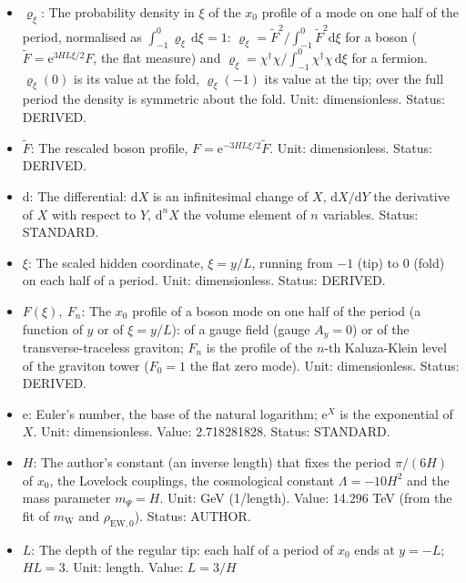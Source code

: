 \documentclass[
  10pt,
]{article}
\providecommand{\tightlist}{%
  \setlength{\itemsep}{0pt}\setlength{\parskip}{0pt}}
\begin{document}
\begin{itemize}
\tightlist
\item
  \(\varrho_\xi\): The probability density in \(\xi\) of the \(x_0\)
  profile of a mode on one half of the period, normalised as
  \(\int_{-1}^{0}\varrho_\xi\,\mathrm{d}\xi = 1\):
  \(\varrho_\xi = \tilde F^2/\int_{-1}^{0}\tilde F^2\mathrm{d}\xi\) for
  a boson (\(\tilde F = \mathrm{e}^{3HL\xi/2}F\), the flat measure) and
  \(\varrho_\xi = \chi^\dagger\chi/\int_{-1}^{0}\chi^\dagger\chi\,\mathrm{d}\xi\)
  for a fermion. \(\varrho_\xi(0)\) is its value at the fold,
  \(\varrho_\xi(-1)\) its value at the tip; over the full period the
  density is symmetric about the fold. Unit: dimensionless. Status:
  DERIVED.
\item
  \(\tilde F\): The rescaled boson profile,
  \(F = \mathrm{e}^{-3HL\xi/2}\tilde F\). Unit: dimensionless. Status:
  DERIVED.
\item
  \(\mathrm{d}\): The differential: \(\mathrm{d}X\) is an infinitesimal
  change of \(X\), \(\mathrm{d}X/\mathrm{d}Y\) the derivative of \(X\)
  with respect to \(Y\), \(\mathrm{d}^nX\) the volume element of \(n\)
  variables. Status: STANDARD.
\item
  \(\xi\): The scaled hidden coordinate, \(\xi = y/L\), running from
  \(-1\) (tip) to \(0\) (fold) on each half of a period. Unit:
  dimensionless. Status: DERIVED.
\item
  \(F(\xi),\ F_n\): The \(x_0\) profile of a boson mode on one half of
  the period (a function of \(y\) or of \(\xi = y/L\)): of a gauge field
  (gauge \(A_y = 0\)) or of the transverse-traceless graviton; \(F_n\)
  is the profile of the \(n\)-th Kaluza-Klein level of the graviton
  tower (\(F_0 = 1\) the flat zero mode). Unit: dimensionless. Status:
  DERIVED.
\item
  \(\mathrm{e}\): Euler's number, the base of the natural logarithm;
  \(\mathrm{e}^{X}\) is the exponential of \(X\). Unit: dimensionless.
  Value: 2.718281828. Status: STANDARD.
\item
  \(H\): The author's constant (an inverse length) that fixes the period
  \(\pi/(6H)\) of \(x_0\), the Lovelock couplings, the cosmological
  constant \(\Lambda = -10H^2\) and the mass parameter \(m_\Psi = H\).
  Unit: GeV (1/length). Value: 14.296 TeV (from the fit of
  \(m_{\mathrm{W}}\) and \(\rho_{\mathrm{EW},0}\)). Status: AUTHOR.
\item
  \(L\): The depth of the regular tip: each half of a period of \(x_0\)
  ends at \(y = -L\); \(HL = 3\). Unit: length. Value: \(L = 3/H\)

\end{itemize}
\end{document}
